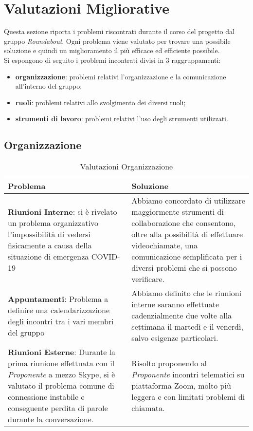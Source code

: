 \section{Valutazioni Migliorative}
	Questa sezione riporta i problemi riscontrati durante il corso del progetto dal gruppo \textit{Roundabout}.
	Ogni problema viene valutato per trovare una possibile soluzione e quindi un miglioramento il più efficace ed efficiente possibile. \\
	Si espongono di seguito i problemi incontrati divisi in 3 raggruppamenti:
	\begin{itemize}
		\item \textbf{organizzazione}: problemi relativi l’organizzazione e la comunicazione all’interno del gruppo;
		\item \textbf{ruoli}: problemi relativi allo svolgimento dei diversi ruoli;
		\item \textbf{strumenti di lavoro}: problemi relativi l’uso degli strumenti utilizzati.
	\end{itemize}

\subsection{Organizzazione}
	\begin{longtable}{ 
		>{\centering}p{} 
		>{\centering\arraybackslash}p{}}
	
		\caption {Valutazioni Organizzazione}		\\
		
		\textbf{\color{white}Problema} &
		\textbf{\color{white}Soluzione}
		\tabularnewline  
		\endhead
		
		\textbf{Riunioni Interne}: si è rivelato un problema organizzativo l'impossibilità di vedersi fisicamente a causa della situazione di emergenza COVID-19 & Abbiamo concordato di utilizzare maggiormente strumenti di collaborazione che consentono, oltre alla possibilità di effettuare videochiamate, una comunicazione semplificata per i diversi problemi che si possono verificare. \\
		
		\textbf{Appuntamenti}: Problema a definire una calendarizzazione degli incontri tra i vari membri del gruppo & Abbiamo definito che le riunioni interne saranno effettuate cadenzialmente due volte alla settimana il martedì e il venerdì, salvo esigenze particolari.\\
		
		\textbf{Riunioni Esterne}: Durante la prima riunione effettuata con il \textit{Proponente} a mezzo Skype, si è valutato il problema comune di connessione instabile e conseguente perdita di parole durante la conversazione. & Risolto proponendo al \textit{Proponente}	incontri telematici su piattaforma Zoom, molto più leggera e con limitati problemi di chiamata.\\
				
		\end{longtable}


